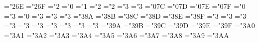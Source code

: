 { \def\bmVert{\delimiter"\mtbsy@@6B\mtbex@@0D }%
 \def\bmupdownarrow{\delimiter"3\mtbsy@@6C\mtbex@@3F }%
 \def\bmUpdownarrow{\delimiter"3\mtbsy@@6D\mtbex@@77 }%
 \def\bmbackslash{\delimiter"\mtbsy@@6E\mtbex@@0F }%
 \def\bmarrowvert{\delimiter"\mtbsy@@6A\mtbex@@3C }%
 \def\bmArrowvert{\delimiter"\mtbsy@@6\mtbex@@3D }%
 \def\bmlgroup{\delimiter"4\mtbmi@@2E\mtbex@@3A }%
 \def\bmrgroup{\delimiter"5\mtbmi@@2F\mtbex@@3B }%
 \def\bmbracevert{\delimiter"\mtbex@@8D\mtbex@@8D }%
 \mathchardef\bmsetminus="2\mtbsy@@6E 
 \mathchardef\bmwr="2\mtbsy@@6F
 \def\bmsurd{{\mathchar"1\mtbsy@@70}}%
 \mathchardef\bmamalg="2
 \mathchardef\bmnabla="0
 \mathchardef\bmsmallint="1
 \mathchardef\bmsqcup="2
 \mathchardef\bmsqcap="2
 \mathchardef\bmsqsubseteq="3
 \mathchardef\bmsqsupseteq="3
 \mathchardef\bmclubsuit="0\mtbsy@@7C
 \mathchardef\bmdiamondsuit="0\mtbsy@@7D
 \mathchardef\bmheartsuit="0\mtbsy@@7E
 \mathchardef\bmspadesuit="0\mtbsy@@7F
 \mathchardef\bmhbar="0
 \mathchardef\bmnotin="3
 \mathchardef\bmangle="0
 \mathchardef\bmdoteq="3
 \mathchardef\bmmodels="3
 \mathchardef\bmbowtie="3
 \mathchardef\bmcong="3\mtbsy@@8A
 \mathchardef\bmhookleftarrow="3\mtbsy@@8B
 \mathchardef\bmhookrightarrow="3\mtbsy@@8C
 \mathchardef\bmlongleftarrow="3\mtbsy@@8D
 \mathchardef\bmlongrightarrow="3\mtbsy@@8E
 \mathchardef\bmLongleftarrow="3\mtbsy@@8F
 \mathchardef\bmLongrightarrow="3
 \mathchardef\bmmapsto="3
 \mathchardef\bmlongmapsto="3
 \mathchardef\bmlongleftrightarrow="3
 \mathchardef\bmLongleftrightarrow="3
 \def\bmiff{\;\bmLongleftrightarrow\;}%
 \mathchardef\bmrightleftharpoons="3
 \mathchardef\bmnotless="3
 \mathchardef\bmnotleq="3
 \mathchardef\bmnotprec="3
 \mathchardef\bmnotpreceq="3
 \mathchardef\bmnotsubset="3\mtbsy@@9A
 \mathchardef\bmnotsubseteq="3\mtbsy@@9B
 \mathchardef\bmnotsqsubseteq="3\mtbsy@@9C
 \mathchardef\bmnotgr="3\mtbsy@@9D
 \mathchardef\bmnotgeq="3\mtbsy@@9E
 \mathchardef\bmnotsucc="3\mtbsy@@9F
 \mathchardef\bmnotsucceq="3\mtbsy@@ A0
 \mathchardef\bmnotsupset="3\mtbsy@@ A1
 \mathchardef\bmnotsupseteq="3\mtbsy@@ A2
 \mathchardef\bmnotsqsupseteq="3\mtbsy@@ A3
 \mathchardef\bmneq="3\mtbsy@@ A4 \let\bmne=\bmneq
 \mathchardef\bmnotequiv="3\mtbsy@@ A5
 \mathchardef\bmnotsim="3\mtbsy@@ A6
 \mathchardef\bmnotsimeq="3\mtbsy@@ A7
 \mathchardef\bmnotapprox="3\mtbsy@@ A8
 \mathchardef\bmnotcong="3\mtbsy@@ A9
 \mathchardef\bmnotasymp="3\mtbsy@@ AA
 \def\bmgrave{\ifnum\fam=\m@ne\mathaccent"0\mtbsy@@4A \else\@grave@\fi}%
}
